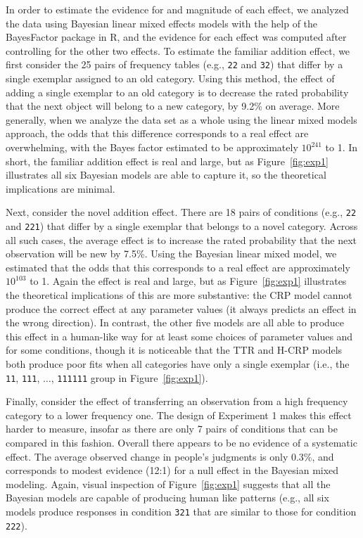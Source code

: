 \documentclass[doc]{apa6}
\newcommand{\dist}[1]{\texttt{#1}}
\begin{document}
In order to estimate the evidence for and magnitude of each effect, we analyzed the data using Bayesian linear mixed effects models with the help of the BayesFactor package in R, and the evidence for each effect was computed after controlling for the other two effects. To estimate the familiar addition effect, we first consider the 25 pairs of frequency tables (e.g., \dist{22} and \dist{32}) that differ by a single exemplar assigned to an old category. Using this method, the effect of adding a single exemplar to an old category is to decrease the rated probability that the next object will belong to a new category, by 9.2\% on average. More generally, when we analyze the data set as a whole using the linear mixed models approach, the odds that this difference corresponds to a real effect are overwhelming, with the Bayes factor estimated to be approximately $10^{241}$ to 1. In short, the familiar addition effect is real and large, but as Figure~\ref{fig:exp1} illustrates all six Bayesian models are able to capture it, so the theoretical implications are minimal.

Next, consider the novel addition effect. There are 18 pairs of conditions (e.g., \dist{22} and \dist{221}) that differ by a single exemplar that belongs to a novel category. Across all such cases, the average effect is to increase the rated probability that the next observation will be new by 7.5\%. Using the Bayesian linear mixed model, we estimated that the odds that this corresponds to a real effect are approximately $10^{103}$ to 1. Again the effect is real and large, but as Figure~\ref{fig:exp1} illustrates the theoretical implications of this are more substantive: the CRP model cannot produce the correct effect at any parameter values (it always predicts an effect in the wrong direction). In contrast, the other five models are all able to produce this effect in a human-like way for at least some choices of parameter values and for some conditions, though it is noticeable that the TTR and H-CRP models both produce poor fits when all categories have only a single exemplar (i.e., the \dist{11}, \dist{111}, $\ldots$, \dist{111111} group in Figure~\ref{fig:exp1}).

Finally, consider the effect of transferring an observation from a high frequency category to a lower frequency one. The design of Experiment 1 makes this effect harder to measure, insofar as there are only 7 pairs of conditions that can be compared in this fashion. Overall there appears to be no evidence of a systematic effect. The average observed change in people's judgments is only 0.3\%, and corresponds to modest evidence (12:1) for a null effect in the Bayesian mixed modeling. Again, visual inspection of Figure~\ref{fig:exp1} suggests that all the Bayesian models are capable of producing human like patterns (e.g., all six models produce responses in condition \dist{321} that are similar to those for condition \dist{222}).
\end{document}
